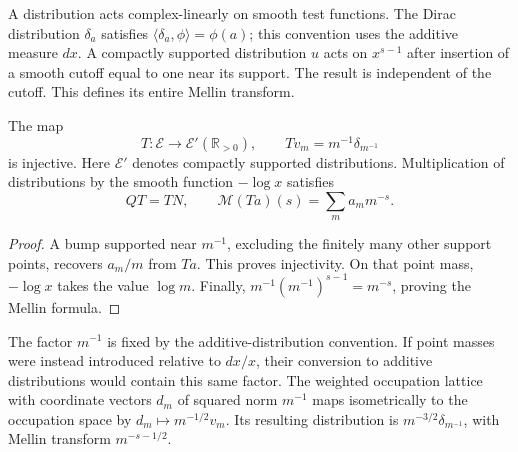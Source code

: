 A distribution acts complex-linearly on smooth test functions.
The Dirac distribution $\delta_a$ satisfies
$\langle\delta_a,\phi\rangle=\phi(a)$; this convention uses the
additive measure $dx$. A compactly supported distribution $u$
acts on $x^{s-1}$ after insertion of a smooth cutoff equal to one
near its support. The result is independent of the cutoff. This
defines its entire Mellin transform.

\begin{proposition}
\label{v4-arith:mo:occupation}
The map
\begin{equation}
 T:\mathscr E\longrightarrow\mathscr E'(\mathbb R_{>0}),
 \qquad Tv_m=m^{-1}\delta_{m^{-1}}
 \label{v4-arith:mo:embedding}
\end{equation}
is injective. Here $\mathscr E'$ denotes compactly supported
distributions. Multiplication of distributions by the smooth
function $-\log x$ satisfies
\[
 QT=TN,\qquad
 \mathcal M(Ta)(s)=\sum_m a_m m^{-s}.
\]
\end{proposition}
\begin{proof}
A bump supported near $m^{-1}$, excluding the finitely many other
support points, recovers $a_m/m$ from $Ta$. This proves injectivity.
On that point mass, $-\log x$ takes the value $\log m$.
Finally,
$m^{-1}(m^{-1})^{s-1}=m^{-s}$, proving the Mellin formula.
\end{proof}

The factor $m^{-1}$ is fixed by the additive-distribution convention.
If point masses were instead introduced relative to $dx/x$, their
conversion to additive distributions would contain this same factor.
The weighted occupation lattice with coordinate vectors $d_m$ of
squared norm $m^{-1}$ maps isometrically to the occupation space by
$d_m\mapsto m^{-1/2}v_m$. Its resulting distribution is
$m^{-3/2}\delta_{m^{-1}}$, with Mellin transform $m^{-s-1/2}$.

